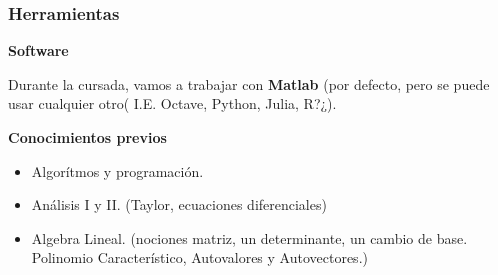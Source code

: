 \documentclass[xcolor=svgnames]{beamer} %
\theoremstyle{plain}
\renewcommand{\textbf}[1]{{\bfseries\textcolor{redUnq2}{#1}}}
\theoremstyle{definition}
\begin{document}
\begin{frame}
\frametitle{Herramientas}
\textbf{Software}

Durante la cursada, vamos a trabajar con \textbf{Matlab} (por defecto, pero se puede usar cualquier otro( I.E. Octave, Python, Julia, R?¿).


\textbf{Conocimientos previos}

\begin{itemize}
\item Algorítmos y programación.
\item Análisis I y II. (Taylor, ecuaciones diferenciales)
\item Algebra Lineal. (nociones matriz, un determinante, un cambio de base. Polinomio Característico, Autovalores y Autovectores.)
\end{itemize}

\end{frame}
\end{document}
